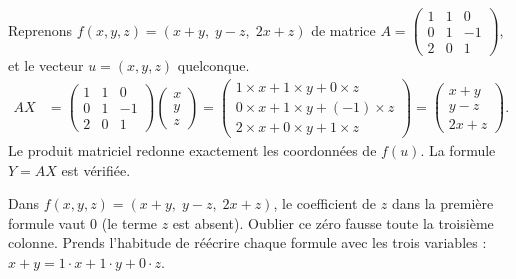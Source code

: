 \documentclass[11pt]{article}
\begin{document}
\begin{experience}[Vérification de la formule $Y = AX$ sur un exemple]
Reprenons $f(x,y,z) = (x+y,\; y-z,\; 2x+z)$ de matrice $A = \begin{pmatrix} 1 & 1 & 0 \\ 0 & 1 & -1 \\ 2 & 0 & 1 \end{pmatrix}$, et le vecteur $u = (x, y, z)$ quelconque.
\begin{align*}
AX &= \begin{pmatrix} 1 & 1 & 0 \\ 0 & 1 & -1 \\ 2 & 0 & 1 \end{pmatrix} \begin{pmatrix} x \\ y \\ z \end{pmatrix}
= \begin{pmatrix} 1 \times x + 1 \times y + 0 \times z \\ 0 \times x + 1 \times y + (-1) \times z \\ 2 \times x + 0 \times y + 1 \times z \end{pmatrix}
= \begin{pmatrix} x + y \\ y - z \\ 2x + z \end{pmatrix}.
\end{align*}
Le produit matriciel redonne exactement les coordonnées de $f(u)$. La formule $Y = AX$ est vérifiée.
\end{experience}

\begin{attention}
Dans $f(x,y,z) = (x + y,\; y - z,\; 2x + z)$, le coefficient de $z$ dans la première formule vaut $0$ (le terme $z$ est absent). Oublier ce zéro fausse toute la troisième colonne. Prends l'habitude de réécrire chaque formule avec les trois variables : $x + y = 1\cdot x + 1\cdot y + 0\cdot z$.
\end{attention}
\end{document}
